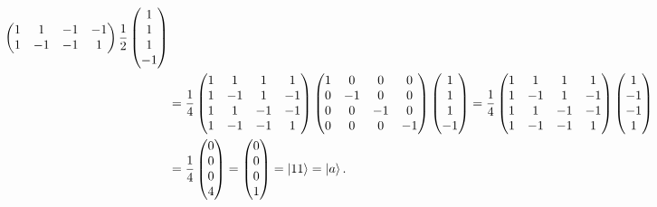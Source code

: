 \documentclass[a4paper, 10pt]{article}
\begin{document}
\begin{solution}
\begin{align*}
\begin{pmatrix}
			           1 & 1  & -1 & -1 \\
			           1 & -1 & -1 & 1
		           \end{pmatrix}
		\frac{1}{2}\begin{pmatrix} 1 \\ 1 \\ 1 \\ -1 \end{pmatrix}                                                                            \\
		 & = \frac{1}{4}\begin{pmatrix}
			                1 & 1  & 1  & 1  \\
			                1 & -1 & 1  & -1 \\
			                1 & 1  & -1 & -1 \\
			                1 & -1 & -1 & 1
		                \end{pmatrix}
		\begin{pmatrix}
			1 & 0  & 0  & 0  \\
			0 & -1 & 0  & 0  \\
			0 & 0  & -1 & 0  \\
			0 & 0  & 0  & -1
		\end{pmatrix}
		\begin{pmatrix} 1 \\ 1 \\ 1 \\ -1 \end{pmatrix}
		= \frac{1}{4}\begin{pmatrix}
			             1 & 1  & 1  & 1  \\
			             1 & -1 & 1  & -1 \\
			             1 & 1  & -1 & -1 \\
			             1 & -1 & -1 & 1
		             \end{pmatrix}
		\begin{pmatrix} 1 \\ -1 \\ -1 \\ 1 \end{pmatrix}                                                                                      \\
		 & = \frac{1}{4}\begin{pmatrix} 0 \\ 0 \\ 0 \\ 4 \end{pmatrix} = \begin{pmatrix} 0 \\ 0 \\ 0 \\ 1 \end{pmatrix} = \ket{11} = \ket{a}.

\end{align*}
\end{solution}
\end{document}
